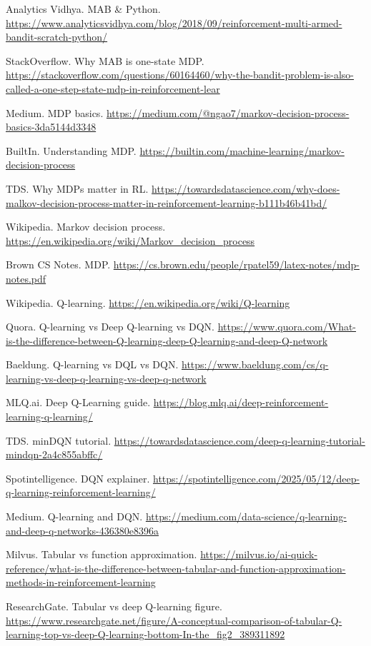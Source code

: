 \documentclass[11pt]{article}
\begin{document}
\begin{enumerate}[leftmargin=1.2em,label={[\arabic*]}]
\item Analytics Vidhya. MAB \& Python. \url{https://www.analyticsvidhya.com/blog/2018/09/reinforcement-multi-armed-bandit-scratch-python/}
\item StackOverflow. Why MAB is one-state MDP. \url{https://stackoverflow.com/questions/60164460/why-the-bandit-problem-is-also-called-a-one-step-state-mdp-in-reinforcement-lear}
\item Medium. MDP basics. \url{https://medium.com/@ngao7/markov-decision-process-basics-3da5144d3348}
\item BuiltIn. Understanding MDP. \url{https://builtin.com/machine-learning/markov-decision-process}
\item TDS. Why MDPs matter in RL. \url{https://towardsdatascience.com/why-does-malkov-decision-process-matter-in-reinforcement-learning-b111b46b41bd/}
\item Wikipedia. Markov decision process. \url{https://en.wikipedia.org/wiki/Markov_decision_process}
\item Brown CS Notes. MDP. \url{https://cs.brown.edu/people/rpatel59/latex-notes/mdp-notes.pdf}
\item Wikipedia. Q-learning. \url{https://en.wikipedia.org/wiki/Q-learning}
\item Quora. Q-learning vs Deep Q-learning vs DQN. \url{https://www.quora.com/What-is-the-difference-between-Q-learning-deep-Q-learning-and-deep-Q-network}
\item Baeldung. Q-learning vs DQL vs DQN. \url{https://www.baeldung.com/cs/q-learning-vs-deep-q-learning-vs-deep-q-network}
\item MLQ.ai. Deep Q-Learning guide. \url{https://blog.mlq.ai/deep-reinforcement-learning-q-learning/}
\item TDS. minDQN tutorial. \url{https://towardsdatascience.com/deep-q-learning-tutorial-mindqn-2a4c855abffc/}
\item Spotintelligence. DQN explainer. \url{https://spotintelligence.com/2025/05/12/deep-q-learning-reinforcement-learning/}
\item Medium. Q-learning and DQN. \url{https://medium.com/data-science/q-learning-and-deep-q-networks-436380e8396a}
\item Milvus. Tabular vs function approximation. \url{https://milvus.io/ai-quick-reference/what-is-the-difference-between-tabular-and-function-approximation-methods-in-reinforcement-learning}
\item ResearchGate. Tabular vs deep Q-learning figure. \url{https://www.researchgate.net/figure/A-conceptual-comparison-of-tabular-Q-learning-top-vs-deep-Q-learning-bottom-In-the_fig2_389311892}

\end{enumerate}
\end{document}
